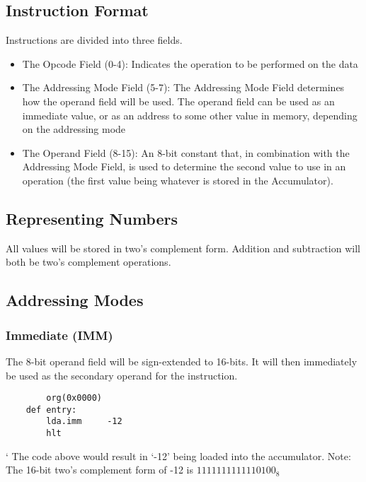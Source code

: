 \documentclass[11pt]{article}
\begin{document}
    \subsection{Instruction Format}\label{subsec:instruction-format}
    \par Instructions are divided into three fields.
    \begin{itemize}
        \item The Opcode Field (0-4): Indicates the operation to be performed on the data
        \item The Addressing Mode Field (5-7): The Addressing Mode Field determines how the operand field will be used.
        The operand field can be used as an immediate value, or as an address to some other value in memory,
        depending on the addressing mode
        \item The Operand Field (8-15): An 8-bit constant that, in combination with the Addressing Mode Field, is
        used to determine the second value to use in an operation (the first value being whatever is stored in the Accumulator).
    \end{itemize}

    \subsection{Representing Numbers}\label{subsec:representing-numbers}
    \par All values will be stored in two's complement form.
    Addition and subtraction will both be two's complement operations.

    \subsection{Addressing Modes}\label{subsec:addressing-modes}

    \subsubsection{Immediate (IMM)}
    \par The 8-bit operand field will be sign-extended to 16-bits.
    It will then immediately be used as the secondary operand for the instruction.
    \begin{verbatim}
        org(0x0000)
    def entry:
        lda.imm     -12
        hlt
    \end{verbatim}`
    The code above would result in `-12' being loaded into the accumulator.
    Note: The 16-bit two's complement form of -12 is $1111111111110100_{8}$
\end{document}
